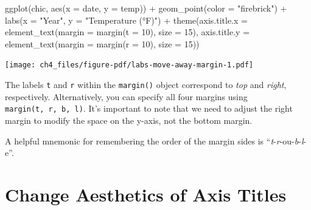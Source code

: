 \documentclass[
  letterpaper,
]{scrbook}
\newenvironment{Shaded}{\begin{snugshade}}{\end{snugshade}}
\newcommand{\AttributeTok}[1]{\textcolor[rgb]{0.40,0.45,0.13}{#1}}
\newcommand{\DecValTok}[1]{\textcolor[rgb]{0.68,0.00,0.00}{#1}}
\newcommand{\FunctionTok}[1]{\textcolor[rgb]{0.28,0.35,0.67}{#1}}
\newcommand{\NormalTok}[1]{\textcolor[rgb]{0.00,0.23,0.31}{#1}}
\newcommand{\SpecialCharTok}[1]{\textcolor[rgb]{0.37,0.37,0.37}{#1}}
\newcommand{\StringTok}[1]{\textcolor[rgb]{0.13,0.47,0.30}{#1}}
\begin{document}
\begin{Shaded}
\begin{Highlighting}[]
\FunctionTok{ggplot}\NormalTok{(chic, }\FunctionTok{aes}\NormalTok{(}\AttributeTok{x =}\NormalTok{ date, }\AttributeTok{y =}\NormalTok{ temp)) }\SpecialCharTok{+}
  \FunctionTok{geom\_point}\NormalTok{(}\AttributeTok{color =} \StringTok{"firebrick"}\NormalTok{) }\SpecialCharTok{+}
  \FunctionTok{labs}\NormalTok{(}\AttributeTok{x =} \StringTok{"Year"}\NormalTok{, }\AttributeTok{y =} \StringTok{"Temperature (°F)"}\NormalTok{) }\SpecialCharTok{+}
  \FunctionTok{theme}\NormalTok{(}\AttributeTok{axis.title.x =} \FunctionTok{element\_text}\NormalTok{(}\AttributeTok{margin =} \FunctionTok{margin}\NormalTok{(}\AttributeTok{t =} \DecValTok{10}\NormalTok{), }\AttributeTok{size =} \DecValTok{15}\NormalTok{),}
        \AttributeTok{axis.title.y =} \FunctionTok{element\_text}\NormalTok{(}\AttributeTok{margin =} \FunctionTok{margin}\NormalTok{(}\AttributeTok{r =} \DecValTok{10}\NormalTok{), }\AttributeTok{size =} \DecValTok{15}\NormalTok{))}
\end{Highlighting}
\end{Shaded}

\texttt{[image: ch4\_files/figure-pdf/labs-move-away-margin-1.pdf]}

The labels \texttt{t} and \texttt{r} within the \texttt{margin()} object
correspond to \emph{top} and \emph{right}, respectively. Alternatively,
you can specify all four margins using \texttt{margin(t,\ r,\ b,\ l)}.
It's important to note that we need to adjust the right margin to modify
the space on the y-axis, not the bottom margin.

\begin{tcolorbox}[enhanced jigsaw, toprule=.15mm, bottomtitle=1mm, coltitle=black, breakable, colbacktitle=quarto-callout-tip-color!10!white, opacityback=0, toptitle=1mm, colframe=quarto-callout-tip-color-frame, titlerule=0mm, title=\textcolor{quarto-callout-tip-color}{\faLightbulb}\hspace{0.5em}{Having trouble with Margins?}, bottomrule=.15mm, arc=.35mm, opacitybacktitle=0.6, leftrule=.75mm, left=2mm, rightrule=.15mm, colback=white]

A helpful mnemonic for remembering the order of the margin sides is
``\emph{t}-\emph{r}-ou-\emph{b}-\emph{l}-e''.

\end{tcolorbox}

\section{Change Aesthetics of Axis
Titles}\label{change-aesthetics-of-axis-titles}
\end{document}
